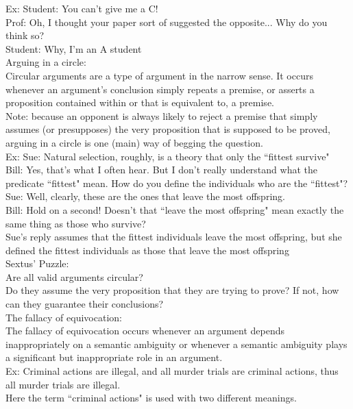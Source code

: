 \documentclass[11pt, fleqn]{article}
\begin{document}
Ex: Student: You can't give me a C!\\
Prof: Oh, I thought your paper sort of suggested the opposite... Why do you think so?\\
Student: Why, I'm an A student\\

Arguing in a circle:\\
Circular arguments are a type of argument in the narrow sense. It occurs whenever an argument's conclusion simply repeats a premise, or asserts a proposition contained within or that is equivalent to, a premise.\\
Note: because an opponent is always likely to reject a premise that simply assumes (or presupposes) the very proposition that is supposed to be proved, arguing in a circle is one (main) way of begging the question.\\

Ex: Sue: Natural selection, roughly, is a theory that only the ``fittest survive"\\
Bill: Yes, that's what I often hear. But I don't really understand what the predicate ``fittest" mean. How do you define the individuals who are the ``fittest"?\\
Sue: Well, clearly, these are the ones that leave the most offspring.\\
Bill: Hold on a second! Doesn't that ``leave the most offspring" mean exactly the same thing as those who survive?\\
Sue's reply assumes that the fittest individuals leave the most offspring, but she defined the fittest individuals as those that leave the most offspring\\

Sextus' Puzzle:\\
Are all valid arguments circular?\\
Do they assume the very proposition that they are trying to prove? If not, how can they guarantee their conclusions?\\

The fallacy of equivocation:\\
The fallacy of equivocation occurs whenever an argument depends inappropriately on a semantic ambiguity or whenever a semantic ambiguity plays a significant but inappropriate role in an argument.\\

Ex: Criminal actions are illegal, and all murder trials are criminal actions, thus all murder trials are illegal.\\
Here the term ``criminal actions" is used with two different meanings.\\
\end{document}
